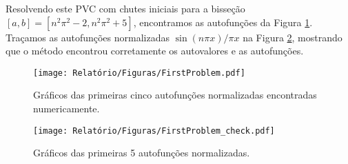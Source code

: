 \documentclass[twocolumn,showpacs,%
  nofootinbib,aps,superscriptaddress,%
  eqsecnum,prd,notitlepage,showkeys,10pt]{revtex4-1}
\begin{document}
Resolvendo este PVC com chutes iniciais para a bisseção $[a,b] = [n^2\pi^2 -2, n^2\pi^2 + 5]$, 
encontramos as autofunções da Figura \ref{fig:first-problem}.
Traçamos as autofunções normalizadas $\sin(n\pi x)/\pi x$ na Figura \ref{fig:first-problem-check},
mostrando
que o método encontrou corretamente os autovalores e as autofunções.
%
\begin{figure}[H]
    \centering
    \texttt{[image: Relatório/Figuras/FirstProblem.pdf]}
    \caption{Gráficos das primeiras cinco autofunções normalizadas
    encontradas numericamente.}\label{fig:first-problem}
\end{figure}
%
%
\begin{figure}[H]
    \centering
    \texttt{[image: Relatório/Figuras/FirstProblem\_check.pdf]}
    \caption{Gráficos das primeiras 5 autofunções normalizadas.}\label{fig:first-problem-check}
\end{figure}
%
%
\end{document}
